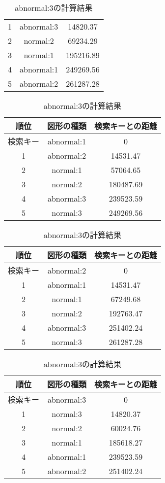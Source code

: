\begin{table}[hbtp]
\begin{minipage}[t]{0.45\hsize}
\begin{tabular}{|c|c|c|}
      1 & abnormal:3 & 14820.37 \\
      2 & normal:2 & 69234.29 \\
      3 & normal:1 & 195216.89 \\
      4 & abnormal:1 & 249269.56 \\
      5 & abnormal:2 & 261287.28 \\
      \hline
    \end{tabular}
  \end{minipage}
  \begin{minipage}[t]{0.45\hsize}
    \centering
    \caption{abnormal:1の計算結果}
    \label{table:4}
    \begin{tabular}{|c|c|c|}
      \hline
      順位 & 図形の種類 & 検索キーとの距離\\
      \hline
      検索キー & abnormal:1 & 0 \\
      1 & abnormal:2 & 14531.47 \\
      2 & normal:1 & 57064.65 \\
      3 & normal:2 & 180487.69 \\
      4 & abnormal:3 & 239523.59 \\
      5 & normal:3 & 249269.56 \\
      \hline
    \end{tabular}
  \end{minipage}
  \begin{minipage}[t]{0.45\hsize}
    \centering
    \caption{abnormal:2の計算結果}
    \label{table:5}
    \begin{tabular}{|c|c|c|}
      \hline
      順位 & 図形の種類 & 検索キーとの距離\\
      \hline
      検索キー & abnormal:2 & 0 \\
      1 & abnormal:1 & 14531.47 \\
      2 & normal:1 & 67249.68 \\
      3 & normal:2 & 192763.47 \\
      4 & abnormal:3 & 251402.24 \\
      5 & normal:3 & 261287.28 \\
      \hline
    \end{tabular}
  \end{minipage}
  \begin{minipage}[t]{0.64\hsize}
    \centering
    \caption{abnormal:3の計算結果}
    \label{table:6}
    \begin{tabular}{|c|c|c|}
      \hline
      順位 & 図形の種類 & 検索キーとの距離\\
      \hline
      検索キー & abnormal:3 & 0 \\
      1 & normal:3 & 14820.37 \\
      2 & normal:2 & 60024.76 \\
      3 & normal:1 & 185618.27 \\
      4 & abnormal:1 & 239523.59 \\
      5 & abnormal:2 & 251402.24 \\
      \hline
    \end{tabular}
  \end{minipage}
\end{table}
